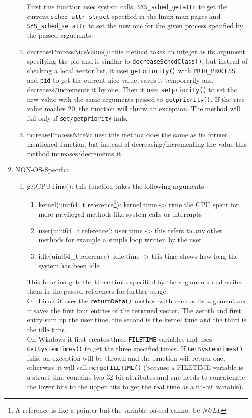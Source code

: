 \begin{enumerate}
\begin{enumerate}
		First this function uses system calls, \texttt{SYS\_sched\_getattr} to get the current \texttt{sched\_attr struct} specified in the linux man pages and \texttt{SYS\_sched\_setattr} to set the new one for the given process specified by the passed arguemnts.\cite{linux-man-set/getattribute}
		\item decreaseProcessNiceValue(): this method takes an integer as its argument specifying the pid and is similar to \texttt{decreaseSchedClass()}, but instead of checking a local vector list, it uses \texttt{getpriority()} with \texttt{PRIO\_PROCESS} and \texttt{pid} to get the current nice value, saves it temporarily and decreases/increments it by one. Then it uses \texttt{setpriority()} to set the new value with the same arguments passed to \texttt{getpriority()}. If the nice value reaches 20, the function will throw an exception. The method will fail only if \texttt{set/getpriority} fails.
		\item increaseProcessNiceValues: this method does the same as its former mentioned function, but instead of decreasing/incrementing the value this method increases/decrements it.
	\end{enumerate}
	\item NON-OS-Specific:
	\begin{enumerate}
		\item getCPUTime(): this function takes the following arguments
		\begin{enumerate}
			\item kernel(uint64\_t reference\footnote{A reference is like a pointer but the variable passed cannot be \textit{NULL}}): kernel time -> time the CPU spent for more \dq privileged\dq{} methods like system calls or interrupts
			\item user(uint64\_t reference): user time -> this refers to any other methods for example a simple loop written by the user
			\item idle(uint64\_t reference): idle time -> this time shows how long the system has been idle 
		\end{enumerate}
		This function gets the three times specified by the arguments and writes them in the passed references for further usage.\\
		On Linux it uses the \texttt{returnData()} method with zero as its argument and it saves the first four entries of the returned vector. The zeroth and first entry sum up the user time, the second is the kernel time and the third is the idle time.\\
		On Windows it first creates three \texttt{FILETIME} variables and uses \texttt{GetSystemTimes()} to get the three specified times. If \texttt{GetSystemTimes()} fails, an exception will be thrown and the function will return one, otherwise it will call \texttt{mergeFILETIME()} (because a FILETIME variable is a struct that contains two 32-bit attributes and one needs to concatenate the lower bits to the upper bits to get the real time as a 64-bit variable).

\end{enumerate}
\end{enumerate}
